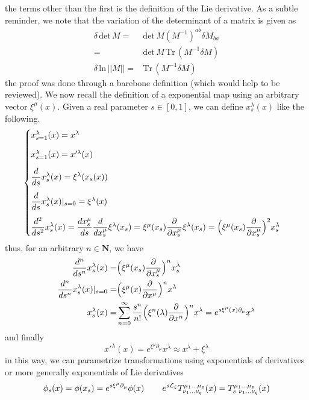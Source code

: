 the terms other than the first is the definition of the Lie derivative. As a subtle reminder, we note that the variation of the determinant of a matrix is given as
\begin{align*}
	\delta \,\mathrm{det}\, M=&\mathrm{det}\,M(M^{-1})^{ab}\delta M_{ba}\\
	=&\mathrm{det}\,M\,\mathrm{Tr}\,(M^{-1}\delta M)\\
	\delta \,\mathrm{ln}\,||M||=&\mathrm{Tr}\,(M^{-1}\delta M)
\end{align*}
the proof was done through a barebone definition (which would help to be reviewed). We now recall the definition of a exponential map using an arbitrary vector $\xi^{\mu }(x)$. Given a real parameter $s \in [0,1]$, we can define $x^{\lambda }_{s}(x)$ like the following.
\[\begin{cases}\vspace{2ex}
x^{\lambda }_{s=1}(x)=x^{\lambda }\\\vspace{2ex}
x^{\lambda }_{s=1}(x)=x'^{\lambda }(x)\\\vspace{2ex}
\dfrac{d }{d s}x_{s}^{\lambda }(x)=\xi^{\lambda }(x_{s}(x))\\\vspace{2ex}
\dfrac{d }{d s}x^{\lambda }_{s}(x)|_{s=0}=\xi^{\lambda }(x) \\
\dfrac{d ^2}{d s^2}x^{\lambda }_{s}(x)=\dfrac{d x_{s}^{\mu }}{d s}\dfrac{d }{d x_{s}^{\mu }}\xi^{\lambda }(x_{s})=\xi^{\mu }(x_{s})\dfrac{\partial }{\partial x^{\mu }_{s}}\xi^{\lambda }(x_{s})=\Big(\xi^{\mu }(x_{s})\dfrac{\partial }{\partial x^{\mu }_{s}} \Big)^2x_{s}^{\lambda }
\end{cases}\]
thus, for an arbitrary $n\in {\bm N}$, we have
\begin{align*}
\vspace{2ex}
\dfrac{d ^{n}}{d s^{n}}x^{\lambda }_{s}(x)=&\Big(\xi^{\mu }(x_{s})\dfrac{\partial }{\partial x_{s}^{\mu }} \Big)^{n}x_{s}^{\lambda }\\\dfrac{d ^{n}}{d s^{n}}x_{s}^{\lambda }(x)|_{s=0}=&\Big(\xi^{\mu }(x)\dfrac{\partial }{\partial x^{\mu }} \Big)^{n} x^{\lambda }\\x^{\lambda }_{s}(x)=&\sum ^{\infty }_{n=0}\dfrac{s^{n}}{n!}\Big(\xi^{n}(\lambda )\dfrac{\partial }{\partial x^{n}} \Big)^{n}x^{\lambda }=e^{s\xi^{\mu }(x)\partial _{\mu }}x^{\lambda }
\end{align*}
and finally
\[x'^{\lambda }(x)=e^{\xi^{\mu }\partial _{\mu }}x^{\lambda }\approx x^{\lambda }+\xi^{\lambda }\]
in this way, we can parametrize transformations using exponentials of derivatives or more generally exponentials of Lie derivatives
\[\phi _{s}(x)=\phi (x_{s})=e^{s\xi^{\mu }\partial _{\mu }}\phi (x)\hspace{5ex}e^{s\mathcal{L}_{\xi}}T^{\mu_1\ldots \mu _{p}}_{\nu_1\ldots \nu _{q}}(x)=T^{\mu_1\ldots \mu _{p}}_{s\ \nu_1\ldots \nu _{q}}(x)\]

\vspace{2ex}
